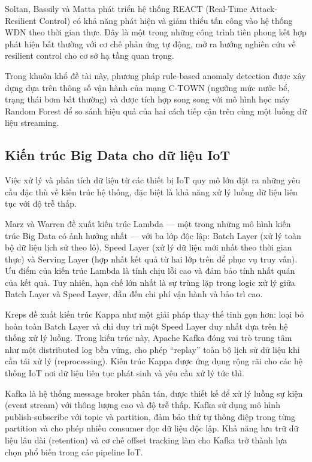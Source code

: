 Soltan, Bassily và Matta \cite{soltan2018react} phát triển hệ thống REACT
(Real-Time Attack-Resilient Control) có khả năng phát hiện và giảm thiểu tấn công
vào hệ thống WDN theo thời gian thực. Đây là một trong những công trình tiên phong
kết hợp phát hiện bất thường với cơ chế phản ứng tự động, mở ra hướng nghiên cứu
về resilient control cho cơ sở hạ tầng quan trọng.

Trong khuôn khổ đề tài này, phương pháp rule-based anomaly detection được xây dựng
dựa trên thông số vận hành của mạng C-TOWN (ngưỡng mức nước bể, trạng thái bơm
bất thường) và được tích hợp song song với mô hình học máy Random Forest để so
sánh hiệu quả của hai cách tiếp cận trên cùng một luồng dữ liệu streaming.

\subsection{Kiến trúc Big Data cho dữ liệu IoT}

Việc xử lý và phân tích dữ liệu từ các thiết bị IoT quy mô lớn đặt ra những yêu
cầu đặc thù về kiến trúc hệ thống, đặc biệt là khả năng xử lý luồng dữ liệu liên
tục với độ trễ thấp.

Marz và Warren \cite{marz2015big} đề xuất kiến trúc Lambda --- một trong những mô
hình kiến trúc Big Data có ảnh hưởng nhất --- với ba lớp độc lập: Batch Layer (xử
lý toàn bộ dữ liệu lịch sử theo lô), Speed Layer (xử lý dữ liệu mới nhất theo
thời gian thực) và Serving Layer (hợp nhất kết quả từ hai lớp trên để phục vụ
truy vấn). Ưu điểm của kiến trúc Lambda là tính chịu lỗi cao và đảm bảo tính nhất
quán của kết quả. Tuy nhiên, hạn chế lớn nhất là sự trùng lặp trong logic xử lý
giữa Batch Layer và Speed Layer, dẫn đến chi phí vận hành và bảo trì cao.

Kreps \cite{kreps2014kappa} đề xuất kiến trúc Kappa như một giải pháp thay thế
tinh gọn hơn: loại bỏ hoàn toàn Batch Layer và chỉ duy trì một Speed Layer duy
nhất dựa trên hệ thống xử lý luồng. Trong kiến trúc này, Apache Kafka đóng vai trò
trung tâm như một distributed log bền vững, cho phép ``replay'' toàn bộ lịch sử dữ
liệu khi cần tái xử lý (reprocessing). Kiến trúc Kappa được ứng dụng rộng rãi cho
các hệ thống IoT nơi dữ liệu liên tục phát sinh và yêu cầu xử lý tức thì.

Kafka \cite{kreps2011kafka} là hệ thống message broker phân tán, được thiết kế để
xử lý luồng sự kiện (event stream) với thông lượng cao và độ trễ thấp. Kafka sử
dụng mô hình publish-subscribe với topic và partition, đảm bảo thứ tự thông điệp
trong từng partition và cho phép nhiều consumer đọc dữ liệu độc lập. Khả năng lưu
trữ dữ liệu lâu dài (retention) và cơ chế offset tracking làm cho Kafka trở thành
lựa chọn phổ biến trong các pipeline IoT.

